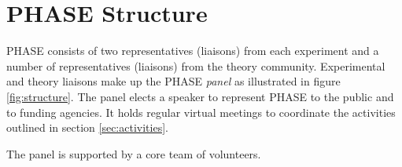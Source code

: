 \section{PHASE Structure}
\label{sec:structure}
PHASE consists of two representatives (liaisons) from each experiment and a number of representatives (liaisons) from the theory community. Experimental and theory liaisons make up the PHASE {\it panel} as illustrated in figure \ref{fig:structure}. The panel elects a speaker to represent PHASE to the public and to funding agencies. It holds regular virtual meetings to coordinate the activities outlined in section \ref{sec:activities}. 

The panel is supported by a core team of volunteers.
